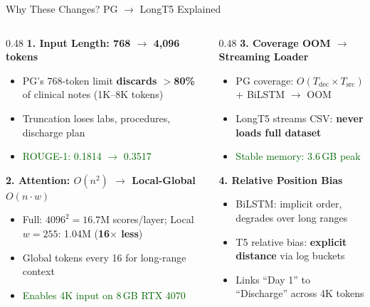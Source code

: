 \documentclass[10pt, aspectratio=169]{beamer}
\begin{document}
\begin{frame}{Why These Changes? PG $\rightarrow$ LongT5 Explained}
  \footnotesize
  \begin{columns}[T]
    \begin{column}{0.48\textwidth}
      \textbf{1. Input Length: 768 $\rightarrow$ 4,096 tokens}
      \begin{itemize}\setlength{\itemsep}{0pt}
        \item PG's 768-token limit \textbf{discards $>$80\%} of clinical notes (1K--8K tokens)
        \item Truncation loses labs, procedures, discharge plan
        \item \textcolor{darkgreen}{ROUGE-1: 0.1814 $\rightarrow$ 0.3517}
      \end{itemize}

      \vspace{0.05cm}
      \textbf{2. Attention: $O(n^2)$ $\rightarrow$ Local-Global $O(n{\cdot}w)$}
      \begin{itemize}\setlength{\itemsep}{0pt}
        \item Full: $4096^2 = 16.7$M scores/layer; Local $w{=}255$: 1.04M (\textbf{16$\times$ less})
        \item Global tokens every 16 for long-range context
        \item \textcolor{darkgreen}{Enables 4K input on 8\,GB RTX 4070}
      \end{itemize}
    \end{column}
    \begin{column}{0.48\textwidth}
      \textbf{3. Coverage OOM $\rightarrow$ Streaming Loader}
      \begin{itemize}\setlength{\itemsep}{0pt}
        \item PG coverage: $O(T_{\text{dec}} {\times} T_{\text{src}})$ + BiLSTM $\rightarrow$ OOM
        \item LongT5 streams CSV: \textbf{never loads full dataset}
        \item \textcolor{darkgreen}{Stable memory: 3.6\,GB peak}
      \end{itemize}

      \vspace{0.05cm}
      \textbf{4. Relative Position Bias}
      \begin{itemize}\setlength{\itemsep}{0pt}
        \item BiLSTM: implicit order, degrades over long ranges
        \item T5 relative bias: \textbf{explicit distance} via log buckets
        \item Links ``Day 1'' to ``Discharge'' across 4K tokens
      \end{itemize}
    \end{column}
  \end{columns}
\end{frame}
\end{document}
